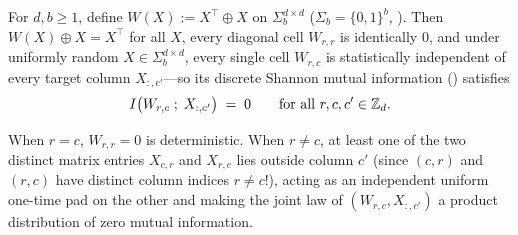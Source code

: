 \begin{proposition}\label{prop:otp-control}
For $d, b \ge 1$, define $W(X) := X^\top \oplus X$ on $\Sigma_b^{d\times d}$ ($\Sigma_b = \{0,1\}^b$,
). Then $W(X) \oplus X = X^\top$ for all $X$, every diagonal cell $W_{r,r}$ is
identically $0$, and under uniformly random $X \in \Sigma_b^{d\times d}$, every single cell
$W_{r,c}$ is statistically independent of every target column $X_{:, c'}$---so its discrete Shannon
mutual information () satisfies
\[
  I\bigl(W_{r,c}\;;\;X_{:,c'}\bigr) \;=\; 0
  \qquad \text{for all } r, c, c' \in \mathbb{Z}_d.
\]
\end{proposition}
\begin{outline}
When $r = c$, $W_{r,r} = 0$ is deterministic. When $r \ne c$, at least one of the two distinct
matrix entries $X_{c,r}$ and $X_{r,c}$ lies outside column $c'$ (since $(c,r)$ and $(r,c)$ have
distinct column indices $r \ne c$!), acting as an independent uniform one-time pad on the other and
making the joint law of $(W_{r,c}, X_{:,c'})$ a product distribution of zero mutual information.
\end{outline}
